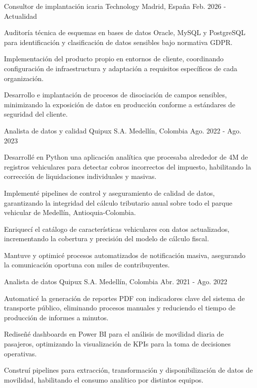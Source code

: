 
\begin{cventries}

\cventry
{Consultor de implantación}
{icaria Technology}
{Madrid, España}
{Feb. 2026 - Actualidad}
{
\begin{cvitems}
\item {Auditoría técnica de esquemas en bases de datos Oracle, MySQL y PostgreSQL para identificación y clasificación de datos sensibles bajo normativa GDPR.}
\item {Implementación del producto propio en entornos de cliente, coordinando configuración de infraestructura y adaptación a requisitos específicos de cada organización.}
\item {Desarrollo e implantación de procesos de disociación de campos sensibles, minimizando la exposición de datos en producción conforme a estándares de seguridad del cliente.}
\end{cvitems}
}

\cventry
{Analista de datos y calidad}
{Quipux S.A.}
{Medellín, Colombia}
{Ago. 2022 - Ago. 2023}
{
\begin{cvitems}
\item {Desarrollé en Python una aplicación analítica que procesaba alrededor de 4M de registros vehiculares para detectar cobros incorrectos del impuesto, habilitando la corrección de liquidaciones individuales y masivas.}
\item {Implementé pipelines de control y aseguramiento de calidad de datos, garantizando la integridad del cálculo tributario anual sobre todo el parque vehicular de Medellín, Antioquia-Colombia.}
\item {Enriquecí el catálogo de características vehiculares con datos actualizados, incrementando la cobertura y precisión del modelo de cálculo fiscal.}
\item {Mantuve y optimicé procesos automatizados de notificación masiva, asegurando la comunicación oportuna con miles de contribuyentes.}
\end{cvitems}
}

\cventry
{Analista de datos}
{Quipux S.A.}
{Medellín, Colombia}
{Abr. 2021 - Ago. 2022}
{
\begin{cvitems}
\item {Automaticé la generación de reportes PDF con indicadores clave del sistema de transporte público, eliminando procesos manuales y reduciendo el tiempo de producción de informes a minutos.}
\item {Rediseñé dashboards en Power BI para el análisis de movilidad diaria de pasajeros, optimizando la visualización de KPIs para la toma de decisiones operativas.}
\item {Construí pipelines para extracción, transformación y disponibilización de datos de movilidad, habilitando el consumo analítico por distintos equipos.}
\end{cvitems}
}

\end{cventries}
